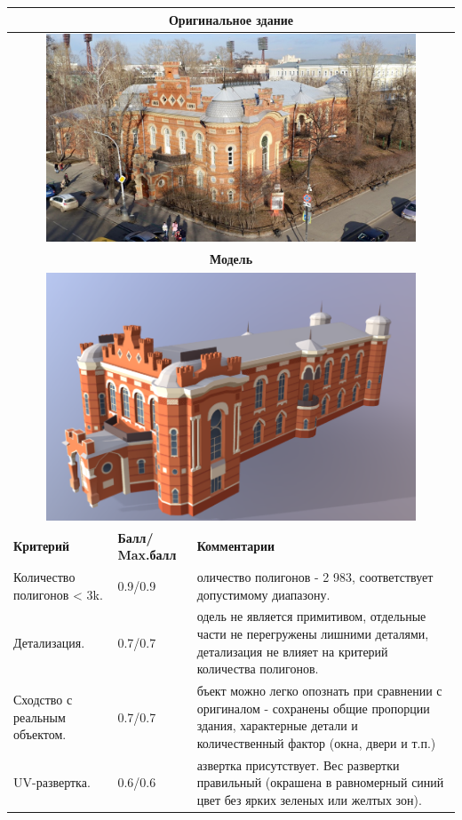 \begin{longtable}{|p{4cm}|p{2.5cm}|p{7.5cm}|}
    \hline
    \multicolumn{3}{|c|}{\textbf{Оригинальное здание} } \\
    \hline
    \multicolumn{3}{|c|}{\includegraphics[width=11cm]{src/build_4}} \\
    \hline
    \multicolumn{3}{|c|}{\textbf{Модель}} \\
    \hline
    \multicolumn{3}{|c|}{\includegraphics[width=11cm]{src/model_4}} \\
    \hline
    \textbf{Критерий} & \textbf{Балл/ Max.балл} & \textbf{Комментарии} \\
    \hline
    Количество полигонов < 3k. & 0.9/0.9 & оличество полигонов - 2 983, соответствует допустимому диапазону. \\
    \hline
    Детализация. & 0.7/0.7 & одель не является примитивом, отдельные части не перегружены лишними деталями, детализация не влияет на критерий количества полигонов. \\
    \hline
    Сходство с реальным объектом. & 0.7/0.7 & бъект можно легко опознать при сравнении с оригиналом - сохранены общие пропорции здания, характерные детали и количественный фактор (окна, двери и т.п.) \\
    \hline
    UV-развертка. & 0.6/0.6 & азвертка присутствует. Вес развертки правильный (окрашена в равномерный синий цвет без ярких зеленых или желтых зон). 
    

\end{longtable}
